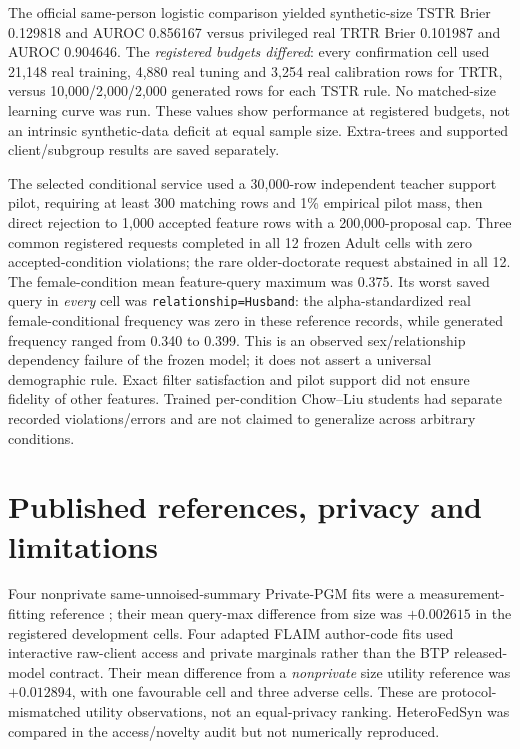 \documentclass[11pt,a4paper]{article}
\begin{document}
The official same-person logistic comparison yielded synthetic-size TSTR Brier 0.129818 and AUROC 0.856167 versus privileged real TRTR Brier 0.101987 and AUROC 0.904646. The \emph{registered budgets differed}: every confirmation cell used 21,148 real training, 4,880 real tuning and 3,254 real calibration rows for TRTR, versus 10,000/2,000/2,000 generated rows for each TSTR rule. No matched-size learning curve was run. These values show performance at registered budgets, not an intrinsic synthetic-data deficit at equal sample size. Extra-trees and supported client/subgroup results are saved separately.

The selected conditional service used a 30,000-row independent teacher support pilot, requiring at least 300 matching rows and 1\% empirical pilot mass, then direct rejection to 1,000 accepted feature rows with a 200,000-proposal cap. Three common registered requests completed in all 12 frozen Adult cells with zero accepted-condition violations; the rare older-doctorate request abstained in all 12. The female-condition mean feature-query maximum was 0.375. Its worst saved query in \emph{every} cell was \texttt{relationship=Husband}: the alpha-standardized real female-conditional frequency was zero in these reference records, while generated frequency ranged from 0.340 to 0.399. This is an observed sex/relationship dependency failure of the frozen model; it does not assert a universal demographic rule. Exact filter satisfaction and pilot support did not ensure fidelity of other features. Trained per-condition Chow--Liu students had separate recorded violations/errors and are not claimed to generalize across arbitrary conditions.

\section{Published references, privacy and limitations}
Four nonprivate same-unnoised-summary Private-PGM fits were a measurement-fitting reference \cite{mckenna2019pgm}; their mean query-max difference from size was $+0.002615$ in the registered development cells. Four adapted FLAIM author-code fits \cite{maddock2024flaim} used interactive raw-client access and private marginals rather than the BTP released-model contract. Their mean difference from a \emph{nonprivate} size utility reference was $+0.012894$, with one favourable cell and three adverse cells. These are protocol-mismatched utility observations, not an equal-privacy ranking. HeteroFedSyn \cite{li2026heterofedsyn} was compared in the access/novelty audit but not numerically reproduced.
\end{document}
